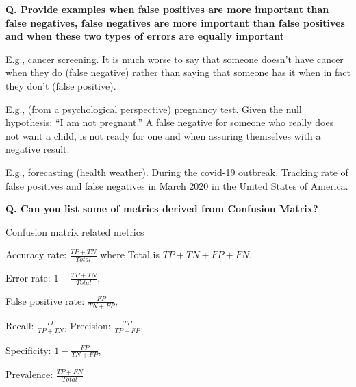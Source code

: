 \begin{frame}[fragile]{\textbf{Q. Provide examples when false positives are more
      important than false negatives, false negatives are more important than
      false positives and when these two types of errors are equally important}}
  \begin{wideitemize}
  \item E.g., cancer screening. It is much worse to say that someone
    doesn't have cancer when they do (false negative) rather than saying that
    someone has it when in fact they don't (false positive).
  \item E.g., (from a psychological perspective) pregnancy test. Given the null
    hypothesis: ``I am not pregnant.'' A false negative for someone who really
    does not want a child, is not ready for one and when assuring themselves
    with a negative result.
  \item E.g., forecasting (health weather). During the covid-19 outbreak.
    Tracking rate of false positives and false negatives in March 2020 in the
    United States of America.
  \end{wideitemize}
\end{frame}

\begin{frame}[fragile]{\textbf{Q. Can you list some of metrics derived from Confusion Matrix?}}
  \begin{wideitemize}
  \item Confusion matrix related metrics
    \begin{wideitemize}
    \item Accuracy rate: {\footnotesize $\frac{TP + TN}{Total}$}
      where {\footnotesize Total is $TP + TN + FP + FN$},\vspace{-.5em}
    \item Error rate: {\footnotesize $1 - \frac{TP + TN}{Total}$},\vspace{-.5em}
    \item False positive rate: {\footnotesize $\frac{FP}{TN + FP}$},\vspace{-.5em}
    \item Recall: {\footnotesize $\frac{TP}{TP + TN}$}, Precision: {\footnotesize $\frac{TP}{TP + FP}$},\vspace{-.5em}
    \item Specificity: {\footnotesize $1 - \frac{FP}{TN + FP}$},\vspace{-.5em}
    \item Prevalence: {\footnotesize $\frac{TP + FN}{Total}$}
    \end{wideitemize}
  \end{wideitemize}
\end{frame}

